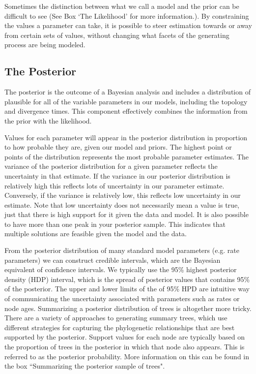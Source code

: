 \documentclass[11pt]{article}
\newcommand{\rw}[1]{{\textcolor{red}{[RW: #1]}}} %
\newcommand{\aw}[1]{{\textcolor{armygreen}{[AW: #1]}}} %
\begin{document}
Sometimes the distinction between what we call a model and the prior can be difficult to see (See Box `The Likelihood' for more information.).
By constraining the values a parameter can take, it is possible to steer estimation towards or away from certain sets of values, without changing what facets of the generating process are being modeled. 

\subsection{The Posterior}

The posterior is the outcome of a Bayesian analysis and includes a distribution of plausible for all of the variable parameters in our models, including the topology and divergence times.
This component effectively combines the information from the prior with the likelihood. %

Values for each parameter will appear in the posterior distribution in proportion to how probable they are, given our model and priors.
The highest point or points of the distribution represents the most probable parameter estimates.
The variance of the posterior distribution for a given parameter reflects the uncertainty in that estimate.
If the variance in our posterior distribution is relatively high this reflects lots of uncertainty in our parameter estimate.
Conversely, if the variance is relatively low, this reflects low uncertainty in our estimate.
Note that low uncertainty does not necessarily mean a value is true, just that there is high support for it given the data and model.
It is also possible to have more than one peak in your posterior sample.
This indicates that multiple solutions are feasible given the model and the data.

From the posterior distribution of many standard model parameters (e.g. rate parameters) we can construct credible intervals, which are the Bayesian equivalent of confidence intervals.  
We typically use the 95\% highest posterior density (HDP) interval, which is the spread of posterior values that contains 95\% of the posterior.
The upper and lower limits of the of 95\% HPD are intuitive way of communicating the uncertainty associated with parameters such as rates or node ages.
Summarizing a posterior distribution of trees is altogether more tricky.
There are a variety of approaches to generating summary trees, which use different strategies for capturing the phylogenetic relationships that are best supported by the posterior.
Support values for each node are typically based on the proportion of trees in the posterior in which that node also appears. 
This is referred to as the posterior probability. 
More information on this can be found in the box ``Summarizing the posterior sample of trees". 
\end{document}
